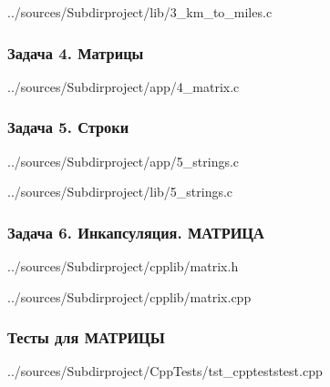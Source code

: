 \documentclass[12pt,a4paper]{report}
\begin{document}

{../sources/Subdirproject/lib/3_km_to_miles.c}
\newpage

\subsubsection{Задача 4. Матрицы}

{../sources/Subdirproject/app/4_matrix.c}
\newpage

\subsubsection{Задача 5. Строки}

{../sources/Subdirproject/app/5_strings.c}


{../sources/Subdirproject/lib/5_strings.c}
\newpage

\subsubsection{Задача 6. Инкапсуляция. МАТРИЦА}

{../sources/Subdirproject/cpplib/matrix.h}


{../sources/Subdirproject/cpplib/matrix.cpp}
\newpage

\subsubsection{Тесты для МАТРИЦЫ}

{../sources/Subdirproject/CppTests/tst_cppteststest.cpp}
\end{document}
